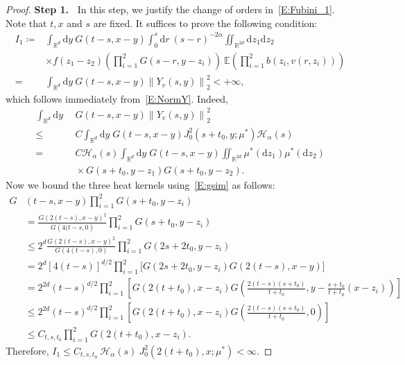 \documentclass[sn-mathphys]{sn-jnl}%
\renewcommand{\R}{\mathbb{R}}
\newcommand{\E}{\mathbb{E}}
\newcommand{\Norm}[1]{\left\| #1 \right\|}
\newcommand{\ud}{\ensuremath{\mathrm{d}}}
\numberwithin{equation}{section}
\theoremstyle{thmstyleone}%
\theoremstyle{thmstyletwo}%
\theoremstyle{thmstylethree}%
\begin{document}
\begin{proof}
  \textbf{\noindent Step 1.~} In this step, we justify the change of orders in~\eqref{E:Fubini_1}.
  Note that $t, x$ and $s$ are fixed. It suffices to prove the following condition:
  \begin{align*}
    I_1\coloneqq & \int_{\R^d}\ud y \: G(t-s,x-y) \int_0^s \ud r\: (s-r)^{-2\alpha} \iint_{\R^{2d}} \ud z_1\ud z_2\:                \\
                 & \times f(z_1-z_2) \left(\prod_{i = 1}^{2} G(s-r,y-z_i)\right) \: \E\left(\prod_{i = 1}^{2}b(z_i,v(r,z_i))\right) \\
       =         & \int_{\R^d}\ud y \: G(t-s,x-y) \Norm{Y_v(s,y)}_2^2 < +\infty,
  \end{align*}
  which follows immediately from~\eqref{E:NormY}. Indeed,
  \begin{align*}
    \int_{\R^d}\ud y \: &\: G(t-s,x-y) \Norm{Y_v(s,y)}_2^2                                                                       \\
    \le                 &\: C \int_{\R^d} \ud y \; G(t-s,x-y) J_0^2 (s+t_0,y;\mu^*) \mathcal{H}_\alpha(s)                        \\
    =                   &\: C \mathcal{H}_\alpha(s) \int_{\R^d} \ud y \; G(t-s,x-y)\iint_{\R^{2d}}\mu^* (\ud z_1)\mu^* (\ud z_2) \\
                        &\: \times G\left(s+t_0,y-z_1\right)G\left(s+t_0,y-z_2\right).
  \end{align*}
  Now we bound the three heat kernels using~\eqref{E:gsim} as follows:
  \begin{align*}
    G & (t-s,x-y) \prod_{i = 1}^{2}G(s+t_0,y- z_i)                                                                                                              \\
      & = \frac{G\left(2(t-s),x-y\right)^2}{G\left(4(t-s,0\right)} \prod_{i = 1}^{2}G\left(s+t_0,y- z_i\right)                                                  \\
      & \le 2^d \frac{G\left(2(t-s),x-y\right)^2}{G\left(4(t-s),0\right)} \prod_{i = 1}^{2}G\left(2s+2t_0,y- z_i\right)                                         \\
      & = 2^d [4(t-s)]^{d/2} \prod_{i = 1}^{2}\bigg[ G\left(2s+2t_0,y- z_i\right)G\left(2(t-s),x-y\right)\bigg]                                                 \\
      & = 2^{2d} (t-s)^{d/2} \prod_{i = 1}^{2}\left[G\left(2(t+t_0),x- z_i\right)G\left(\frac{2(t-s)(s+t_0)}{t+t_0},y-\frac{s+t_0}{t+t_0}(x- z_i)\right)\right] \\
      & \le 2^{2d} (t-s)^{d/2} \prod_{i = 1}^{2}\left[G\left(2(t+t_0),x- z_i\right)G\left(\frac{2(t-s)(s+t_0)}{t+t_0},0\right)\right]                           \\
      & \le C_{t,s,t_0} \prod_{i = 1}^{2} G\left(2(t+t_0),x- z_i\right).
  \end{align*}
  Therefore, $I_1\le C_{t,s,t_0} \: \mathcal{H}_{\alpha}(s) \: J_0^2\left(2(t+t_0),x;\mu^*\right)
  <\infty$. \bigskip


\end{proof}
\end{document}
